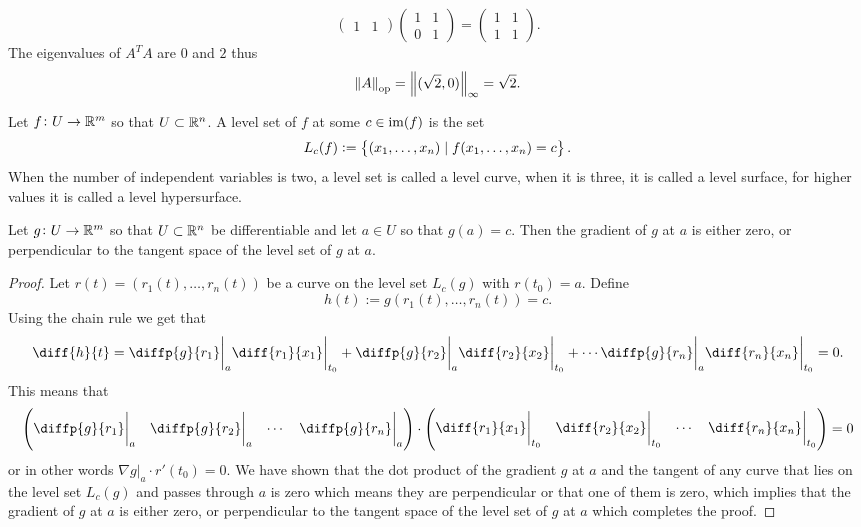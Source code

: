 \documentclass[11pt,a4paper]{article}
\begin{document}
\begin{solution}
\begin{enumerate}
\[\begin{pmatrix}
          1 & 1
        \end{pmatrix}
        \begin{pmatrix}
          1 & 1 \\
          0 & 1
        \end{pmatrix} =
        \begin{pmatrix}
          1 & 1 \\
          1 & 1
        \end{pmatrix}.
      \]
      The eigenvalues of $A^T A$ are $0$ and $2$ thus
      \[
        \left\lVert A\right\rVert_{\operatorname{op}} = \left\lVert(\sqrt{2},0)\right\rVert_{\infty} = \sqrt{2}.
      \]
  \end{enumerate}
\end{solution}

\begin{definition}
  Let $f \colon U \to \mathbb{R}^m$ so that $U \subset \mathbb{R}^n$.
  A level set of $f$ at some $c \in \operatorname{im}(f)$ is the set
  \[
    L_c(f) := \left\{(x_1,\dots,x_n) \mid f(x_1,\dots,x_n) = c\right\}.
  \]
  When the number of independent variables is two,
  a level set is called a level curve,
  when it is three, it is called a level surface,
  for higher values it is called a level hypersurface.
\end{definition}

\begin{proposition}
  \label{prop:lagrange-intuition}
  Let $g \colon U \to \mathbb{R}^m$ so that $U \subset \mathbb{R}^n$ be differentiable
  and let $a \in U$ so that $g(a) = c$.
  Then the gradient of $g$ at $a$ is either zero,
  or perpendicular to the tangent space of the level set of $g$ at $a$.
\end{proposition}
\begin{proof}
  Let $r(t) = (r_1(t),\dots,r_n(t))$ be a curve on the level set $L_c(g)$
  with $r(t_0) = a$.
  Define
  \[
    h(t) := g(r_1(t),\dots,r_n(t)) = c.
  \]
  Using the chain rule we get that
  \[
    \diff{h}{t} =
    \diffp{g}{{r_1}} \biggr\vert_{a} \diff{{r_1}}{{x_1}} \biggr\vert_{t_0} +
    \diffp{g}{{r_2}} \biggr\vert_{a} \diff{{r_2}}{{x_2}} \biggr\vert_{t_0} +
    \cdots
    \diffp{g}{{r_n}} \biggr\vert_{a} \diff{{r_n}}{{x_n}} \biggr\vert_{t_0}
    = 0.
  \]
  This means that
  \[
    \begin{pmatrix}
      \diffp{g}{{r_1}} \biggr\vert_{a} &
      \diffp{g}{{r_2}} \biggr\vert_{a} & \cdots &
      \diffp{g}{{r_n}} \biggr\vert_{a}
    \end{pmatrix} \cdot
    \begin{pmatrix}
      \diff{{r_1}}{{x_1}} \biggr\vert_{t_0} &
      \diff{{r_2}}{{x_2}} \biggr\vert_{t_0} & \cdots &
      \diff{{r_n}}{{x_n}} \biggr\vert_{t_0}
    \end{pmatrix} = 0
  \]
  or in other words $\nabla g\vert_a \cdot r'(t_0) = 0$.
  We have shown that the dot product of the gradient $g$ at $a$
  and the tangent of any curve that lies on the level set $L_c(g)$
  and passes through $a$ is zero which means they are perpendicular or
  that one of them is zero,
  which implies that the gradient of $g$ at $a$ is either zero,
  or perpendicular to the tangent space of
  the level set of $g$ at $a$ which completes the proof.
\end{proof}
\end{document}
